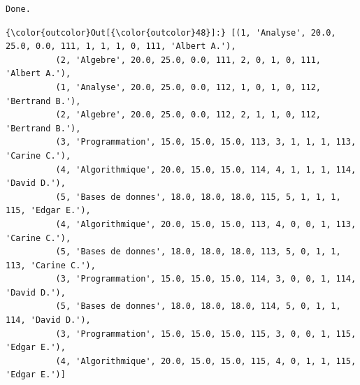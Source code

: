 \documentclass[11pt]{article}
\begin{document}
    \begin{Verbatim}[commandchars=\\\{\}]
Done.

    \end{Verbatim}

\begin{Verbatim}[commandchars=\\\{\}]
{\color{outcolor}Out[{\color{outcolor}48}]:} [(1, 'Analyse', 20.0, 25.0, 0.0, 111, 1, 1, 1, 0, 111, 'Albert A.'),
          (2, 'Algebre', 20.0, 25.0, 0.0, 111, 2, 0, 1, 0, 111, 'Albert A.'),
          (1, 'Analyse', 20.0, 25.0, 0.0, 112, 1, 0, 1, 0, 112, 'Bertrand B.'),
          (2, 'Algebre', 20.0, 25.0, 0.0, 112, 2, 1, 1, 0, 112, 'Bertrand B.'),
          (3, 'Programmation', 15.0, 15.0, 15.0, 113, 3, 1, 1, 1, 113, 'Carine C.'),
          (4, 'Algorithmique', 20.0, 15.0, 15.0, 114, 4, 1, 1, 1, 114, 'David D.'),
          (5, 'Bases de donnes', 18.0, 18.0, 18.0, 115, 5, 1, 1, 1, 115, 'Edgar E.'),
          (4, 'Algorithmique', 20.0, 15.0, 15.0, 113, 4, 0, 0, 1, 113, 'Carine C.'),
          (5, 'Bases de donnes', 18.0, 18.0, 18.0, 113, 5, 0, 1, 1, 113, 'Carine C.'),
          (3, 'Programmation', 15.0, 15.0, 15.0, 114, 3, 0, 0, 1, 114, 'David D.'),
          (5, 'Bases de donnes', 18.0, 18.0, 18.0, 114, 5, 0, 1, 1, 114, 'David D.'),
          (3, 'Programmation', 15.0, 15.0, 15.0, 115, 3, 0, 0, 1, 115, 'Edgar E.'),
          (4, 'Algorithmique', 20.0, 15.0, 15.0, 115, 4, 0, 1, 1, 115, 'Edgar E.')]
\end{Verbatim}
            

    
    
    
    
\end{document}
